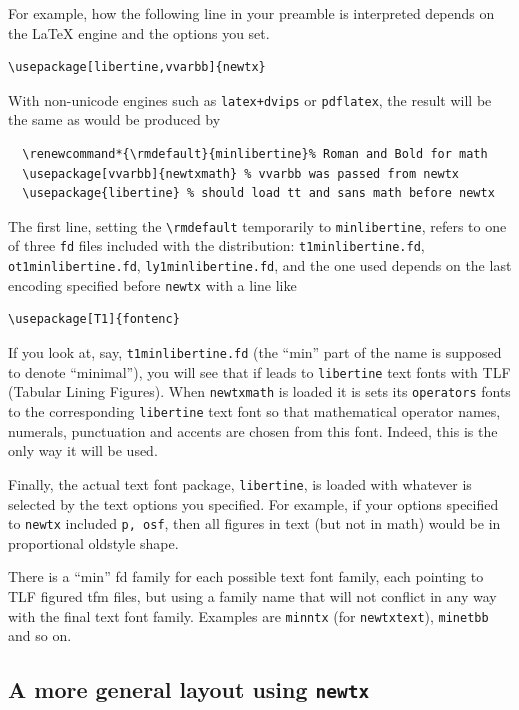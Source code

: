 \documentclass[\fsc]{article}
\theoremstyle{oldplain}
\theoremstyle{plain}
\begin{document}
For example, how the following line in your preamble is interpreted depends on the LaTeX engine and the options you set. 
\begin{verbatim}
\usepackage[libertine,vvarbb]{newtx}
\end{verbatim}
With non-unicode engines such as {\tt latex+dvips} or {\tt pdflatex}, the result will be the same as would be produced by
\begin{verbatim}
  \renewcommand*{\rmdefault}{minlibertine}% Roman and Bold for math
  \usepackage[vvarbb]{newtxmath} % vvarbb was passed from newtx
  \usepackage{libertine} % should load tt and sans math before newtx
\end{verbatim}
The first line, setting the \verb|\rmdefault| temporarily to {\tt minlibertine}, refers to  one of three {\tt fd} files included with the distribution: {\tt t1minlibertine.fd}, {\tt ot1minlibertine.fd}, {\tt ly1minlibertine.fd}, and the one used depends on the last encoding specified before {\tt newtx} with a line like
\begin{verbatim}
\usepackage[T1]{fontenc}
\end{verbatim}
If you look at, say, {\tt t1minlibertine.fd} (the ``min'' part of the name is supposed to denote ``minimal''), you will see that if leads to {\tt libertine} text fonts with TLF (Tabular Lining Figures). When {\tt newtxmath} is loaded it is sets its {\tt operators} fonts to the corresponding {\tt libertine} text font so that mathematical operator names, numerals, punctuation and accents are chosen from this font. Indeed, this is the only way it will be used.

Finally, the actual text font package, {\tt libertine}, is loaded with whatever is selected by the text options you specified. For example, if your options specified to {\tt newtx} included {\tt p, osf}, then all figures in text (but not in math) would be in proportional oldstyle shape.

There is a ``min'' fd family for each possible text font family, each pointing to TLF figured tfm files, but using a family name that will not conflict in any way with the final text font family. Examples are {\tt minntx} (for {\tt newtxtext}), {\tt minetbb} and so on.

\subsection{A more general layout using {\tt newtx}}
\end{document}
